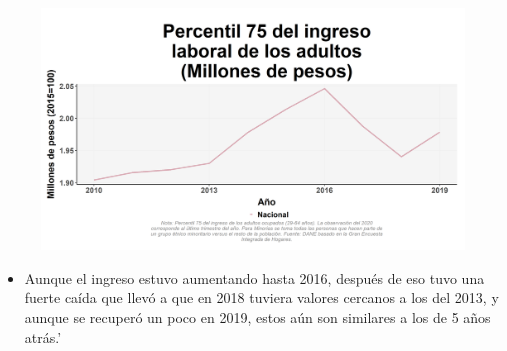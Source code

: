     \begin{figure}[H]
        \caption[Percentil 75 del ingreso laboral de los adultos a nivel nacional ]{\label{inglab75adu_nal_trend} }
        \begin{center}
        \includegraphics[width=\textwidth,keepaspectratio]{img/var_30_trend.png}
        \end{center}
    \end{figure}
            \begin{itemize}
                \item Aunque el ingreso estuvo aumentando hasta 2016, después de eso tuvo una fuerte caída que llevó a que en 2018 tuviera valores cercanos a los del 2013, y aunque se recuperó un poco en 2019, estos aún son similares a los de 5 años atrás.'
                \end{itemize}

